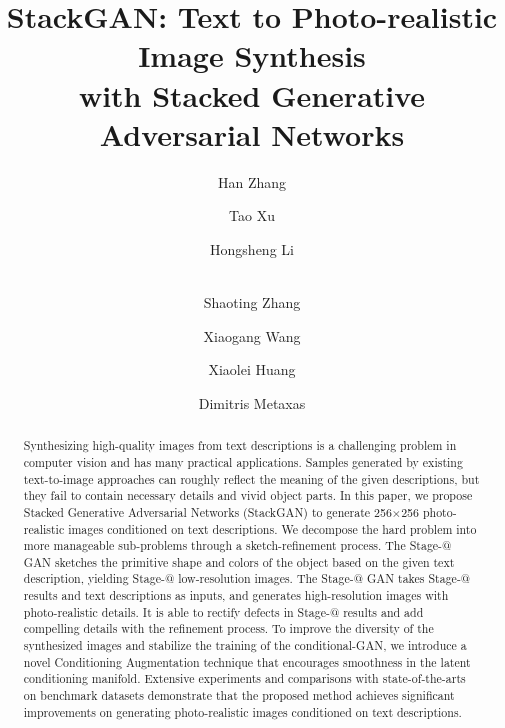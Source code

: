 \documentclass[10pt,twocolumn,letterpaper]{article}
\makeatletter
\newcommand{\Rmnum}[1]{\expandafter\@slowromancap\romannumeral #1@}
\makeatother
\begin{document}
\title{StackGAN: Text to Photo-realistic Image Synthesis \\ with Stacked Generative Adversarial Networks}


\author[1]{Han Zhang} 
\author[2]{\;Tao Xu} 
\author[3]{\;Hongsheng Li} 
\author[4]{\\Shaoting Zhang}
\author[3]{\;Xiaogang  Wang}
\author[2]{\;Xiaolei Huang}
\author[1]{\;Dimitris Metaxas}

\renewcommand\Authands{, }  



\maketitle


\begin{abstract}

Synthesizing high-quality images from text descriptions is a challenging problem in computer vision and has many practical applications. Samples generated by existing text-to-image approaches can roughly reflect the meaning of the given descriptions, but they fail to contain necessary details and vivid object parts. In this paper, we propose Stacked Generative Adversarial Networks (StackGAN) to generate 256$\times$256 photo-realistic images conditioned on text descriptions. We decompose the hard problem into more manageable sub-problems through a sketch-refinement process. The Stage-\Rmnum{1} GAN sketches the primitive shape and colors of the object based on the given text description, yielding Stage-\Rmnum{1} low-resolution images. The Stage-\Rmnum{2} GAN takes Stage-\Rmnum{1} results and text descriptions as inputs, and generates high-resolution images with photo-realistic details. It is able to rectify defects in Stage-\Rmnum{1} results and add compelling details with the refinement process. To improve the diversity of the synthesized images and stabilize the training of the conditional-GAN, we introduce a novel Conditioning Augmentation technique that encourages smoothness in the latent conditioning manifold. Extensive experiments and comparisons with state-of-the-arts on benchmark datasets demonstrate that the proposed method achieves significant improvements on generating photo-realistic images conditioned on text descriptions.


\end{abstract}
\end{document}
